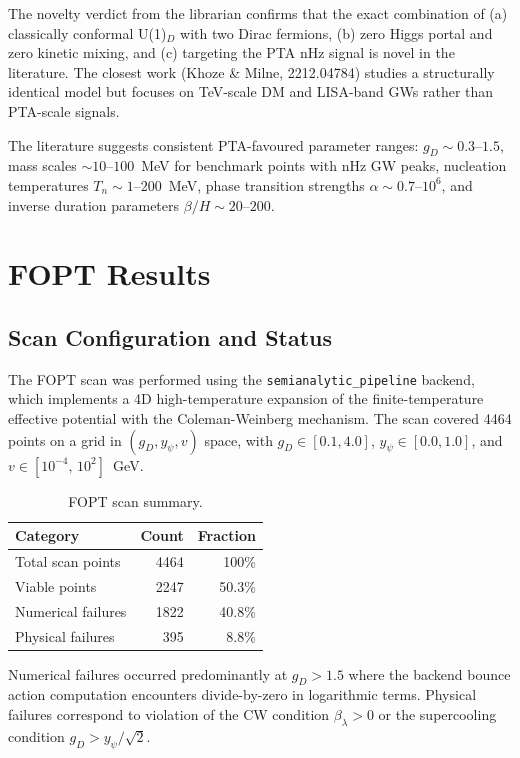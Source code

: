 \documentclass[12pt,a4paper]{article}
\begin{document}
The novelty verdict from the librarian confirms that the exact combination of (a) classically conformal U(1)$_D$ with two Dirac fermions, (b) zero Higgs portal and zero kinetic mixing, and (c) targeting the PTA nHz signal is novel in the literature. The closest work (Khoze \& Milne, 2212.04784) studies a structurally identical model but focuses on TeV-scale DM and LISA-band GWs rather than PTA-scale signals.

The literature suggests consistent PTA-favoured parameter ranges: $g_D \sim 0.3$--$1.5$, mass scales $\sim 10$--$100$~MeV for benchmark points with nHz GW peaks, nucleation temperatures $T_n \sim 1$--$200$~MeV, phase transition strengths $\alpha \sim 0.7$--$10^6$, and inverse duration parameters $\beta/H \sim 20$--$200$.

\section{FOPT Results}
\label{sec:fopt}

\subsection{Scan Configuration and Status}

The FOPT scan was performed using the \texttt{semianalytic\_pipeline} backend, which implements a 4D high-temperature expansion of the finite-temperature effective potential with the Coleman-Weinberg mechanism. The scan covered 4464 points on a grid in $(g_D, y_\psi, v)$ space, with $g_D \in [0.1, 4.0]$, $y_\psi \in [0.0, 1.0]$, and $v \in [10^{-4},\,10^2]$~GeV.

\begin{table}[H]
\centering
\caption{FOPT scan summary.}
\label{tab:fopt_scan}
\begin{tabular}{lrr}
\toprule
Category & Count & Fraction \\
\midrule
Total scan points & 4464 & 100\% \\
Viable points & 2247 & 50.3\% \\
Numerical failures & 1822 & 40.8\% \\
Physical failures & 395 & 8.8\% \\
\bottomrule
\end{tabular}
\end{table}

Numerical failures occurred predominantly at $g_D > 1.5$ where the backend bounce action computation encounters divide-by-zero in logarithmic terms. Physical failures correspond to violation of the CW condition $\beta_\lambda > 0$ or the supercooling condition $g_D > y_\psi/\sqrt{2}$.
\end{document}
